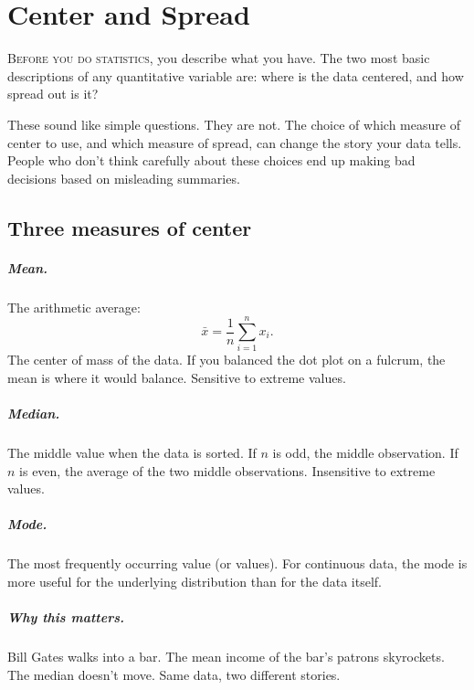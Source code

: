 \chapter{Center and Spread}
\label{ch:center-spread}

\noindent\textsc{Before you do statistics,} you describe what you have. The two most basic descriptions of any quantitative variable are: where is the data centered, and how spread out is it?

These sound like simple questions. They are not. The choice of which measure of center to use, and which measure of spread, can change the story your data tells. People who don't think carefully about these choices end up making bad decisions based on misleading summaries.

\section{Three measures of center}

\paragraph{Mean.} The arithmetic average:
\begin{equation}
  \bar{x} = \frac{1}{n}\sum_{i=1}^{n} x_i.
  \label{eq:sample-mean}
\end{equation}
The center of mass of the data. If you balanced the dot plot on a fulcrum, the mean is where it would balance. Sensitive to extreme values.

\paragraph{Median.} The middle value when the data is sorted. If $n$ is odd, the middle observation. If $n$ is even, the average of the two middle observations. Insensitive to extreme values.

\paragraph{Mode.} The most frequently occurring value (or values). For continuous data, the mode is more useful for the underlying distribution than for the data itself.

\paragraph{Why this matters.} Bill Gates walks into a bar. The mean income of the bar's patrons skyrockets. The median doesn't move. Same data, two different stories.

